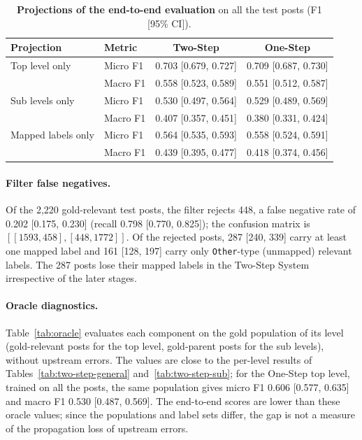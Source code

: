\begin{table}
    \centering
    \caption{\textbf{Projections of the end-to-end evaluation} on all the test posts (F1 [95{\%} CI]).}
    \label{tab:projections}
    \small
    \begin{tabular}{llcc}
        \hline
        \textbf{Projection} & \textbf{Metric} & \textbf{Two-Step} & \textbf{One-Step} \\
        \hline
        Top level only & Micro F1 & 0.703 [0.679, 0.727] & 0.709 [0.687, 0.730] \\
         & Macro F1 & 0.558 [0.523, 0.589] & 0.551 [0.512, 0.587] \\
        Sub levels only & Micro F1 & 0.530 [0.497, 0.564] & 0.529 [0.489, 0.569] \\
         & Macro F1 & 0.407 [0.357, 0.451] & 0.380 [0.331, 0.424] \\
        Mapped labels only & Micro F1 & 0.564 [0.535, 0.593] & 0.558 [0.524, 0.591] \\
         & Macro F1 & 0.439 [0.395, 0.477] & 0.418 [0.374, 0.456] \\
        \hline
    \end{tabular}
\end{table}

\paragraph{Filter false negatives.} Of the 2,220 gold-relevant test posts, the filter rejects 448, a false negative rate of 0.202 [0.175, 0.230] (recall 0.798 [0.770, 0.825]); the confusion matrix is $[[1593, 458], [448, 1772]]$. Of the rejected posts, 287 [240, 339] carry at least one mapped label and 161 [128, 197] carry only \texttt{Other}-type (unmapped) relevant labels. The 287 posts lose their mapped labels in the Two-Step System irrespective of the later stages.

\paragraph{Oracle diagnostics.} Table~\ref{tab:oracle} evaluates each component on the gold population of its level (gold-relevant posts for the top level, gold-parent posts for the sub levels), without upstream errors. The values are close to the per-level results of Tables~\ref{tab:two-step-general} and~\ref{tab:two-step-sub}; for the One-Step top level, trained on all the posts, the same population gives micro F1 0.606 [0.577, 0.635] and macro F1 0.530 [0.487, 0.569]. The end-to-end scores are lower than these oracle values; since the populations and label sets differ, the gap is not a measure of the propagation loss of upstream errors.

